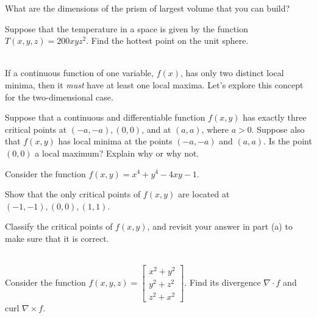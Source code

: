 What are the dimensions of the prism of largest volume that you can build?

\item
{}

Suppose that the temperature in a space is given by the function
$T(x,y,z) = 200xyz^2$.  Find the hottest point on the unit sphere.

\item %
\\
If a continuous function of one variable, $f(x)$, has only two distinct local minima, then it \textit{must} have at least one local maxima. Let's explore this concept for the two-dimensional case. 
\BEN
\item Suppose that a continuous and differentiable function $f(x,y)$ has exactly three critical points at $(-a,-a),(0,0)$, and at $(a,a)$, where $a>0$. Suppose also that $f(x,y)$ has local minima at the points $(-a,-a)$ and $(a,a)$. Is the point $(0,0)$ a local maximum? Explain why or why not.
\item Consider the function $f(x,y)=x^4+y^4-4xy-1$. 
\BEN
\item Show that the only critical points of $f(x,y)$ are located at $(-1,-1),(0,0),(1,1)$. 
\item Classify the critical points of $f(x,y)$, and revisit your answer in part (a) to make sure that it is correct. 
\EEN
\EEN
\item
{}\\
Consider the function $f(x,y,z) = \begin{bmatrix}
                                   x^2 + y^2 \\
                                   y^2 + z^2 \\
                                   z^2 + x^2
                                  \end{bmatrix}$.
Find its divergence $\nabla \cdot f$ and curl $\nabla \times f$.


\EEN
